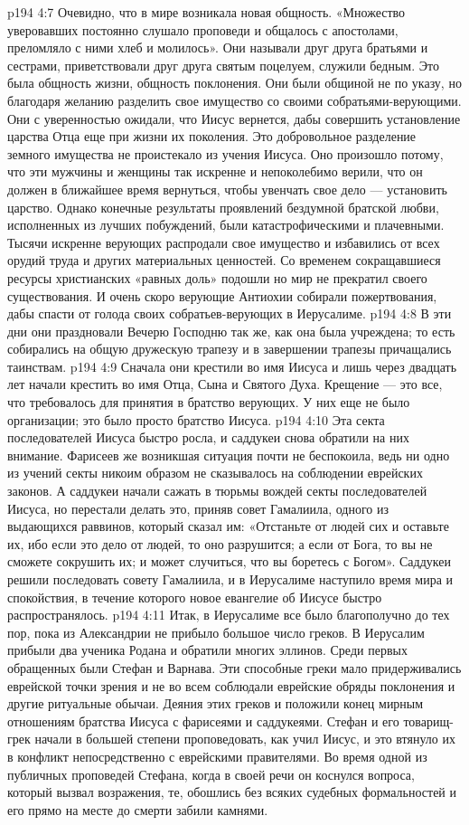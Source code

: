 \vs p194 4:7 Очевидно, что в мире возникала новая общность. «Множество уверовавших постоянно слушало проповеди и общалось с апостолами, преломляло с ними хлеб и молилось». Они называли друг друга братьями и сестрами, приветствовали друг друга святым поцелуем, служили бедным. Это была общность жизни, общность поклонения. Они были общиной не по указу, но благодаря желанию разделить свое имущество со своими собратьями\hyp{}верующими. Они с уверенностью ожидали, что Иисус вернется, дабы совершить установление царства Отца еще при жизни их поколения. Это добровольное разделение земного имущества не проистекало из учения Иисуса. Оно произошло потому, что эти мужчины и женщины так искренне и непоколебимо верили, что он должен в ближайшее время вернуться, чтобы увенчать свое дело --- установить царство. Однако конечные результаты проявлений бездумной братской любви, исполненных из лучших побуждений, были катастрофическими и плачевными. Тысячи искренне верующих распродали свое имущество и избавились от всех орудий труда и других материальных ценностей. Со временем сокращавшиеся ресурсы христианских «равных доль» подошли  но мир не прекратил своего существования. И очень скоро верующие Антиохии собирали пожертвования, дабы спасти от голода своих собратьев\hyp{}верующих в Иерусалиме.
\vs p194 4:8 \pc В эти дни они праздновали Вечерю Господню так же, как она была учреждена; то есть собирались на общую дружескую трапезу и в завершении трапезы причащались таинствам.
\vs p194 4:9 \pc Сначала они крестили во имя Иисуса и лишь через двадцать лет начали крестить во имя Отца, Сына и Святого Духа. Крещение --- это все, что требовалось для принятия в братство верующих. У них еще не было организации; это было просто братство Иисуса.
\vs p194 4:10 \pc Эта секта последователей Иисуса быстро росла, и саддукеи снова обратили на них внимание. Фарисеев же возникшая ситуация почти не беспокоила, ведь ни одно из учений секты никоим образом не сказывалось на соблюдении еврейских законов. А саддукеи начали сажать в тюрьмы вождей секты последователей Иисуса, но перестали делать это, приняв совет Гамалиила, одного из выдающихся раввинов, который сказал им: «Отстаньте от людей сих и оставьте их, ибо если это дело от людей, то оно разрушится; а если от Бога, то вы не сможете сокрушить их; и может случиться, что вы боретесь с Богом». Саддукеи решили последовать совету Гамалиила, и в Иерусалиме наступило время мира и спокойствия, в течение которого новое евангелие об Иисусе быстро распространялось.
\vs p194 4:11 Итак, в Иерусалиме все было благополучно до тех пор, пока из Александрии не прибыло большое число греков. В Иерусалим прибыли два ученика Родана и обратили многих эллинов. Среди первых обращенных были Стефан и Варнава. Эти способные греки мало придерживались еврейской точки зрения и не во всем соблюдали еврейские обряды поклонения и другие ритуальные обычаи. Деяния этих греков и положили конец мирным отношениям братства Иисуса с фарисеями и саддукеями. Стефан и его товарищ\hyp{}грек начали в большей степени проповедовать, как учил Иисус, и это втянуло их в конфликт непосредственно с еврейскими правителями. Во время одной из публичных проповедей Стефана, когда в своей речи он коснулся вопроса, который вызвал возражения, те, обошлись без всяких судебных формальностей и его прямо на месте до смерти забили камнями.
